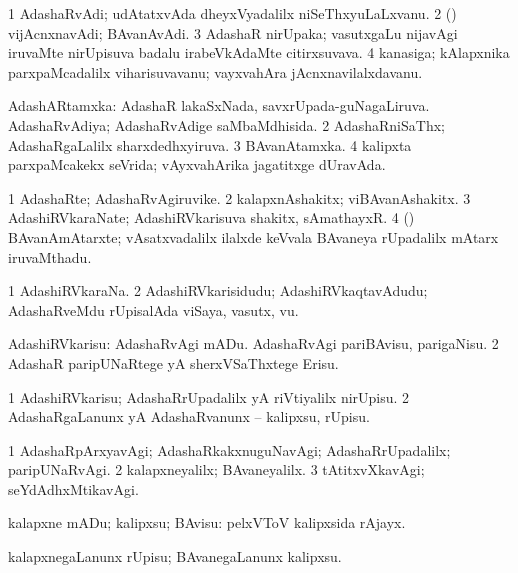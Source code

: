 \bentry
{}
\gl{\nA}
\bmng
\bnum
\num{1} AdashaRvAdi; udAtatxvAda dheyxVyadalilx niSeThxyuLaLxvanu. 
\num{2} (\tashA) vijAcnxnavAdi; BAvanAvAdi. 
\num{3} AdashaR nirUpaka; vasutxgaLu nijavAgi iruvaMte nirUpisuva badalu irabeVkAdaMte citirxsuvava. 
\num{4} kanasiga; kAlapxnika parxpaMcadalilx viharisuvavanu; vayxvahAra jAcnxnavilalxdavanu. 
\enum
\emng
\eentry

\bentry
{}
\gl{\gu}
\bmng
\bnum
{} AdashARtamxka: 
\banum
{} AdashaR lakaSxNada, savxrUpada-guNagaLiruva. 
 AdashaRvAdiya; AdashaRvAdige saMbaMdhisida. 
\eanum
\numie
\num{2} AdashaRniSaThx; AdashaRgaLalilx sharxdedhxyiruva. 
\num{3} BAvanAtamxka. 
\num{4} kalipxta parxpaMcakekx seVrida; vAyxvahArika jagatitxge dUravAda. 
\enum
\emng
\eentry

\bentry
{}
\gl{\nA}
\bmng
\bnum
\num{1} AdashaRte; AdashaRvAgiruvike. 
\num{2} kalapxnAshakitx; viBAvanAshakitx. 
\num{3} AdashiRVkaraNate; AdashiRVkarisuva shakitx, sAmathayxR. 
\num{4} (\tashA) BAvanAmAtarxte; vAsatxvadalilx ilalxde keVvala BAvaneya rUpadalilx mAtarx iruvaMthadu. 
\enum
\emng
\eentry

\bentry
{}
\gl{\nA}
\bmng
\bnum
\num{1} AdashiRVkaraNa. 
\num{2} AdashiRVkarisidudu; AdashiRVkaqtavAdudu; AdashaRveMdu rUpisalAda viSaya, vasutx, \mo vu. 
\enum
\emng
\eentry

\bentry
{}
\gl{\sakirx}
\bmng
\bnum
{} AdashiRVkarisu: 
\banum
{} AdashaRvAgi mADu. 
 AdashaRvAgi pariBAvisu, parigaNisu. 
\eanum
\numie
\num{2} AdashaR paripUNaRtege yA sherxVSaThxtege Erisu. 
\enum
\emng

\noindent
\gl{\akirx}
\bmng
\bnum
\num{1} AdashiRVkarisu; AdashaRrUpadalilx yA riVtiyalilx nirUpisu. 
\num{2} AdashaRgaLanunx yA AdashaRvanunx -- kalipxsu, rUpisu. 
\enum
\emng
\eentry

\bentry
{}
\gl{\kirxvi}
\bmng
\bnum
\num{1} AdashaRpArxyavAgi; AdashaRkakxnuguNavAgi; AdashaRrUpadalilx; paripUNaRvAgi. 
\num{2} kalapxneyalilx; BAvaneyalilx. 
\num{3} tAtitxvXkavAgi; seYdAdhxMtikavAgi. 
\enum
\emng
\eentry

\bentry
{}
\gl{\sakirx}
\bmng
kalapxne mADu; kalipxsu; BAvisu:  pelxVToV kalipxsida rAjayx. 
\emng

\noindent
\gl{\akirx}
\bmng
kalapxnegaLanunx rUpisu; BAvanegaLanunx kalipxsu. 
\emng
\eentry

